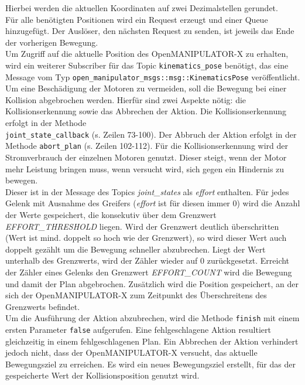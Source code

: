 Hierbei werden die aktuellen Koordinaten auf zwei Dezimalstellen gerundet.\\
Für alle benötigten Positionen wird ein Request erzeugt und einer Queue hinzugefügt.
Der Auslöser, den nächsten Request zu senden, ist jeweils das Ende der vorherigen Bewegung.\\
Um Zugriff auf die aktuelle Position des OpenMANIPULATOR-X zu erhalten, wird ein weiterer Subscriber für das Topic \verb|kinematics_pose| benötigt, das eine Message vom Typ \verb|open_manipulator_msgs::msg::KinematicsPose| veröffentlicht.\\
Um eine Beschädigung der Motoren zu vermeiden, soll die Bewegung bei einer Kollision abgebrochen werden.
Hierfür sind zwei Aspekte nötig: die Kollisionserkennung sowie das Abbrechen der Aktion.
Die Kollisionserkennung erfolgt in der Methode\\\verb|joint_state_callback| (s. Zeilen 73-100).
Der Abbruch der Aktion erfolgt in der Methode \verb|abort_plan| (s. Zeilen 102-112).
Für die Kollisionserkennung wird der Stromverbrauch der einzelnen Motoren genutzt.
Dieser steigt, wenn der Motor mehr Leistung bringen muss, wenn versucht wird, sich gegen ein Hindernis zu bewegen.\\
Dieser ist in der Message des Topics \emph{joint\_states} als \emph{effort} enthalten.
Für jedes Gelenk mit Ausnahme des Greifers (\emph{effort} ist für diesen immer 0) wird die Anzahl der Werte gespeichert, die konsekutiv über dem Grenzwert \emph{EFFORT\_THRESHOLD} liegen.
Wird der Grenzwert deutlich überschritten (Wert ist mind. doppelt so hoch wie der Grenzwert), so wird dieser Wert auch doppelt gezählt um die Bewegung schneller abzubrechen.
Liegt der Wert unterhalb des Grenzwerts, wird der Zähler wieder auf 0 zurückgesetzt.
Erreicht der Zähler eines Gelenks den Grenzwert \emph{EFFORT\_COUNT} wird die Bewegung und damit der Plan abgebrochen.
Zusätzlich wird die Position gespeichert, an der sich der OpenMANIPULATOR-X zum Zeitpunkt des Überschreitens des Grenzwerts befindet.\\
Um die Ausführung der Aktion abzubrechen, wird die Methode \verb|finish| mit einem ersten Parameter \verb|false| aufgerufen.
Eine fehlgeschlagene Aktion resultiert gleichzeitig in einem fehlgeschlagenen Plan.
Ein Abbrechen der Aktion verhindert jedoch nicht, dass der OpenMANIPULATOR-X versucht, das aktuelle Bewegungsziel zu erreichen.
Es wird ein neues Bewegungsziel erstellt, für das der gespeicherte Wert der Kollisionsposition genutzt wird.

